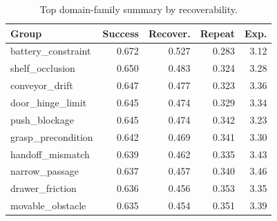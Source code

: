 \begin{table}[t]
\centering
\caption{Top domain-family summary by recoverability.}
\label{tab:domain-summary}
\small
\begin{tabular}{lrrrr}
\toprule
Group & Success & Recover. & Repeat & Exp. \\
\midrule
battery\_constraint & 0.672 & 0.527 & 0.283 & 3.12 \\
shelf\_occlusion & 0.650 & 0.483 & 0.324 & 3.28 \\
conveyor\_drift & 0.647 & 0.477 & 0.323 & 3.36 \\
door\_hinge\_limit & 0.645 & 0.474 & 0.329 & 3.34 \\
push\_blockage & 0.645 & 0.474 & 0.342 & 3.23 \\
grasp\_precondition & 0.642 & 0.469 & 0.341 & 3.30 \\
handoff\_mismatch & 0.639 & 0.462 & 0.335 & 3.43 \\
narrow\_passage & 0.637 & 0.457 & 0.340 & 3.46 \\
drawer\_friction & 0.636 & 0.456 & 0.353 & 3.35 \\
movable\_obstacle & 0.635 & 0.454 & 0.351 & 3.39 \\
\bottomrule
\end{tabular}
\end{table}
